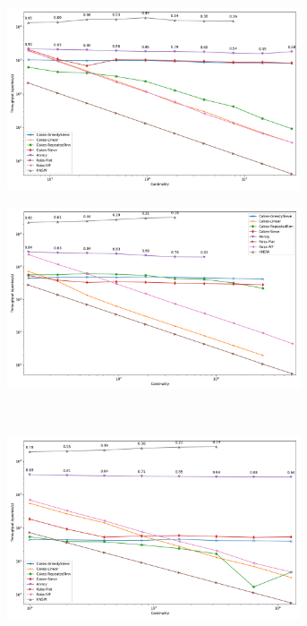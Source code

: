 \begin{figure}
\begin{subfigure}[b]{0.4\textwidth}
\includegraphics[width=0.95\textwidth]{plots/fashion-mnist-knn-10.png}\\
\label{fig:results:fashion-mnist-scaling}
\end{subfigure}%
\begin{subfigure}[b]{0.4\textwidth}
\includegraphics[width=0.95\textwidth]{plots/glove-25-knn-10.png}\\
\label{fig:results:glove-25-scaling}
\end{subfigure}%
\\
\begin{subfigure}[b]{0.4\textwidth}
\includegraphics[width=0.95\textwidth]{plots/sift-knn-10.png}\\

\end{subfigure}
\end{figure}
